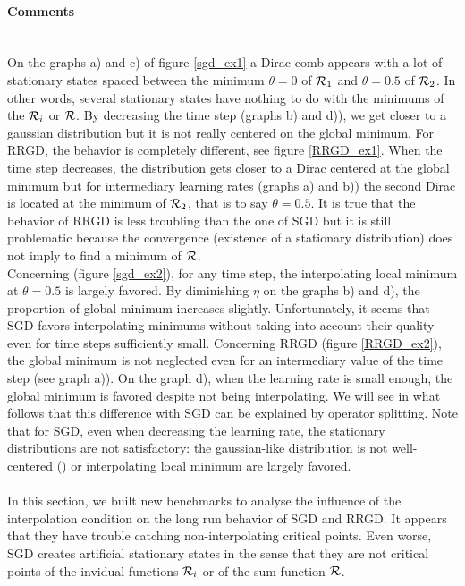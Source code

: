 \paragraph{Comments}
~~\\
On the graphs a) and c) of figure \ref{sgd_ex1} a Dirac comb appears with a lot of stationary states spaced between the minimum $\theta=0$ of $\mathcal{R}_1$ and $\theta=0.5$ of $\mathcal{R}_2$. In
other words, several stationary states have nothing to do with the minimums of the $\mathcal{R}_i$ or $\mathcal{R}$. By decreasing the time step (graphs b) and d)), we get closer to a gaussian
distribution but it is not really centered on the global minimum. For RRGD, the behavior is completely different, see figure \ref{RRGD_ex1}. When the time step decreases, the distribution gets closer to a Dirac centered at the global minimum but for intermediary learning rates (graphs a) and b)) the second Dirac is located at the minimum of $\mathcal{R}_2$, that is to say $\theta=0.5$. It is true that the behavior of RRGD is less troubling than the one of SGD but it is still problematic because the convergence (existence of a stationary distribution) does not imply to find a minimum of $\mathcal{R}$. \\
Concerning \exTwo (figure \ref{sgd_ex2}), for any time step, the interpolating local minimum at $\theta=0.5$ is largely favored. By diminishing $\eta$ on the graphs b) and d), the proportion of global minimum increases slightly. Unfortunately, it seems that SGD favors interpolating minimums without taking into account their quality even for time steps sufficiently small. Concerning RRGD (figure \ref{RRGD_ex2}), the global minimum is not neglected even for an intermediary value of the time step (see graph a)). On the graph d), when the learning rate is small enough, the global minimum is favored despite not being interpolating. We will see in what follows that this difference with SGD can be explained by operator splitting. 
Note that for SGD, even when decreasing the learning rate, the stationary distributions are not satisfactory: the gaussian-like distribution is not well-centered (\exOne) or interpolating
local minimum are largely favored.

\paragraph{}
In this section, we built new benchmarks to analyse the influence of the interpolation condition on the long run behavior of SGD and RRGD. It appears that they have trouble catching non-interpolating critical points. Even worse, SGD creates artificial stationary states in the sense that they are not critical points of the invidual functions $\mathcal{R}_i$ or of the sum function $\mathcal{R}$.   

